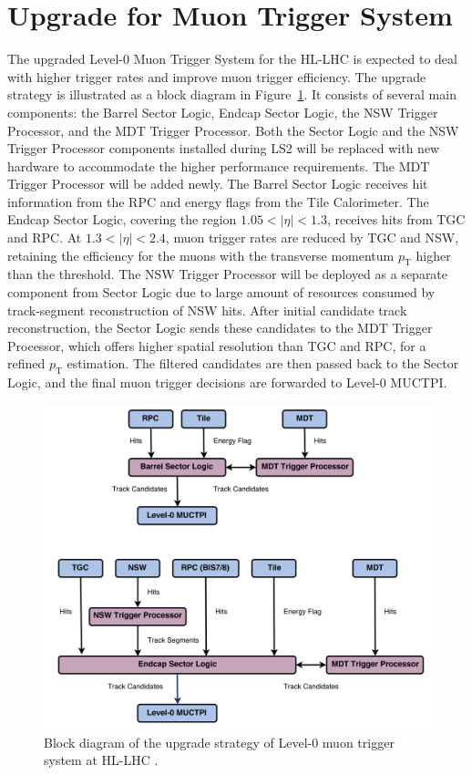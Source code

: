 \section{Upgrade for Muon Trigger System} \label{sec:MuonTriggerUpgrade}
The upgraded Level-0 Muon Trigger System for the HL-LHC is expected to deal with higher trigger rates and improve muon trigger efficiency. The upgrade strategy is illustrated as a block diagram in Figure~\ref{fig:muon_trigger_upgrade}. It consists of several main components: the Barrel Sector Logic, Endcap Sector Logic, the NSW Trigger Processor, and the MDT Trigger Processor. Both the Sector Logic and the NSW Trigger Processor components installed during LS2 will be replaced with new hardware to accommodate the higher performance requirements. The MDT Trigger Processor will be added newly. The Barrel Sector Logic receives hit information from the RPC and energy flags from the Tile Calorimeter. The Endcap Sector Logic, covering the region $1.05 < |\eta| < 1.3$, receives hits from TGC and RPC. At $1.3 < |\eta| < 2.4$, muon trigger rates are reduced by TGC and NSW, retaining the efficiency for the muons with the transverse momentum $p_\mathrm{T}$ higher than the threshold. The NSW Trigger Processor will be deployed as a separate component from Sector Logic due to large amount of resources consumed by track-segment reconstruction of NSW hits. After initial candidate track reconstruction, the Sector Logic sends these candidates to the MDT Trigger Processor, which offers higher spatial resolution than TGC and RPC, for a refined $p_\mathrm{T}$ estimation. The filtered candidates are then passed back to the Sector Logic, and the final muon trigger decisions are forwarded to Level-0 MUCTPI.

\begin{figure}[htbp]
  \centering
  \includegraphics[width=1.0\textwidth]{figs/chapter2/muon_trigger_upgrade.png}
  \caption{Block diagram of the upgrade strategy of Level-0 muon trigger system at HL-LHC \cite{TDAQ_TDR}.}
  \label{fig:muon_trigger_upgrade}
\end{figure}
